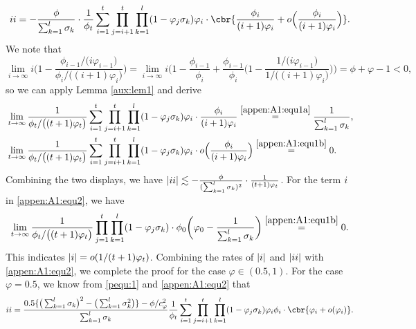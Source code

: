 \begin{equation*}
\uppercase\expandafter{\romannumeral2} 
=-\frac{\phi}{\sum_{k=1}^{l}\sigma_k}\cdot \frac{1}{\phi_t} \sum_{i=1}^t\prod_{j=i+1}^t \prod_{k=1}^l (1-\varphi_j\sigma_k)\varphi_i\cdot\cbr{\frac{\phi_i}{(i+1)\varphi_i} + o\Big(\frac{\phi_i}{(i+1)\varphi_i}\Big)}.
\end{equation*}
We note that
\begin{equation*}
\lim\limits_{i\rightarrow \infty}i\bigg(1-\frac{\phi_{i-1}/\big(i\varphi_{i-1}\big)}{\phi_{i}/\big((i+1)\varphi_{i}\big)}\bigg) = \lim\limits_{i\rightarrow \infty}i\bigg(1-\frac{\phi_{i-1}}{\phi_{i}}+\frac{\phi_{i-1}}{\phi_{i}}\Big(1-\frac{1/\big(i\varphi_{i-1}\big)}{1/\big((i+1)\varphi_{i}\big)}\Big)\bigg) = \phi+\varphi-1<0,
\end{equation*}
so we can apply Lemma \ref{aux:lem1} and derive 
\begin{align*}
&\lim_{t\rightarrow \infty}\frac{1}{\phi_{t}/\big((t+1)\varphi_{t}\big)} \sum_{i=1}^t\prod_{j=i+1}^t \prod_{k=1}^l (1-\varphi_j\sigma_k)\varphi_i \cdot\frac{\phi_i}{(i+1)\varphi_i}\stackrel{\eqref{appen:A1:equ1a}}{=} \frac{1}{\sum_{k=1}^l \sigma_k},\\
&\lim_{t\rightarrow \infty}\frac{1}{\phi_{t}/\big((t+1)\varphi_{t}\big)} \sum_{i=1}^t\prod_{j=i+1}^t \prod_{k=1}^l (1-\varphi_j\sigma_k)\varphi_i \cdot o\Big(\frac{\phi_i}{(i+1)\varphi_i}\Big)\stackrel{\eqref{appen:A1:equ1b}}{=} 0.
\end{align*}
Combining the two displays, we have $|\uppercase\expandafter{\romannumeral2}| \lesssim -\frac{\phi}{(\sum_{k=1}^l \sigma_k)^2}\cdot\frac{1}{(t+1)\varphi_t}$. For the term $\uppercase\expandafter{\romannumeral1}$ in \eqref{appen:A1:equ2}, we have
\begin{equation*}
\lim_{t\rightarrow\infty}\frac{1}{\phi_{t}/\big((t+1)\varphi_{t}\big)} \prod_{j=1}^t \prod_{k=1}^l (1-\varphi_j\sigma_k)\cdot \phi_0\bigg(\varphi_0-\frac{1}{\sum_{k=1}^{l}\sigma_k}\bigg)\stackrel{\eqref{appen:A1:equ1b}}{=} 0.
\end{equation*}
This indicates $|\uppercase\expandafter{\romannumeral1}|=o(1/(t+1)\varphi_t)$. Combining the rates of $|\uppercase\expandafter{\romannumeral1}|$ and $|\uppercase\expandafter{\romannumeral2}|$ with \eqref{appen:A1:equ2}, we complete the proof for the case $\varphi\in(0.5,1)$. For the case $\varphi = 0.5$, we know from \eqref{pequ:1} and \eqref{appen:A1:equ2} that
\begin{equation*}
\uppercase\expandafter{\romannumeral2} = \frac{0.5\{\big(\sum_{k=1}^l \sigma_k\big)^2-\big(\sum_{k=1}^l \sigma_k^2\big)\}-\phi/c_{\varphi}^2}{\sum_{k=1}^{l}\sigma_k}\frac{1}{\phi_t} \sum_{i=1}^t\prod_{j=i+1}^t \prod_{k=1}^l (1-\varphi_j\sigma_k)\varphi_i\phi_i\cdot\cbr{\varphi_i+o(\varphi_i)}.
\end{equation*}
